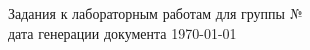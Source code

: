 \begin{center}
\hfill
\vspace{0.35\paperheight}

\Huge{Задания к лабораторным работам для группы №}\\

\normalsize дата генерации документа \today

\thispagestyle{empty} %
\end{center}
 
\newpage
    \tableofcontents %
\newpage